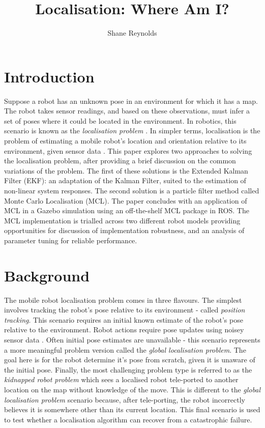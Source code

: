 \documentclass[a4paper]{article}
\begin{document}
\title{Localisation: Where Am I?}
\author{Shane Reynolds}
\maketitle
\tableofcontents
\newpage
\section{Introduction}
Suppose a robot has an unknown pose in an environment for which it has a map. The robot takes sensor readings, and based on these observations, must infer a set of poses where it could be located in the environment. In robotics, this scenario is known as the \textit{localisation problem} \cite{Cox:1991, Wang:1988}. In simpler terms, localisation is the problem of estimating a mobile robot's location and orientation relative to its environment, given sensor data \cite{Thrun:2001}. This paper explores two approaches to solving the localisation problem, after providing a brief discussion on the common variations of the problem. The first of these solutions is the Extended Kalman Filter (EKF): an adaptation of the Kalman Filter, suited to the estimation of non-linear system responses. The second solution is a particle filter method called Monte Carlo Localisation (MCL). The paper concludes with an application of MCL in a Gazebo simulation using an off-the-shelf MCL package in ROS. The MCL implementation is trialled across two different robot models providing opportunities for discussion of implementation robustness, and an analysis of parameter tuning for reliable performance.

\section{Background}
The mobile robot localisation problem comes in three flavours. The simplest involves tracking the robot's pose relative to its environment - called \textit{position tracking}. This scenario requires an initial known estimate of the robot's pose relative to the environment. Robot actions require pose updates using noisey sensor data \cite{Thrun:1999}. Often initial pose estimates are unavailable - this scenario represents a more meaningful problem version called the \textit{global localisation problem}. The goal here is for the robot determine it's pose from scratch, given it is unaware of the initial pose. Finally, the most challenging problem type is referred to as the \textit{kidnapped robot problem} which sees a localised robot tele-ported to another location on the map without knowledge of the move. This is different to the \textit{global localisation problem} scenario because, after tele-porting, the robot incorrectly believes it is somewhere other than its current location. This final scenario is used to test whether a localisation algorithm can recover from a catastrophic failure.
\end{document}
